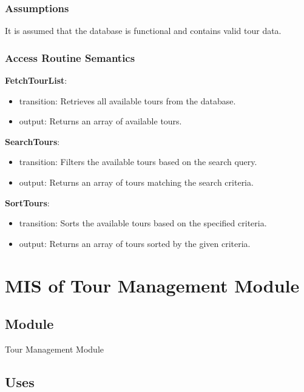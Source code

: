 \documentclass[12pt, titlepage]{article}
\begin{document}
\subsubsection{Assumptions}

It is assumed that the database is functional and contains valid tour data.

\subsubsection{Access Routine Semantics}

\noindent \textbf{FetchTourList}:
\begin{itemize}
  \item transition: Retrieves all available tours from the database.
  \item output: Returns an array of available tours.
\end{itemize}

\noindent \textbf{SearchTours}:
\begin{itemize}
  \item transition: Filters the available tours based on the search query.
  \item output: Returns an array of tours matching the search criteria.
\end{itemize}

\noindent \textbf{SortTours}:
\begin{itemize}
  \item transition: Sorts the available tours based on the specified criteria.
  \item output: Returns an array of tours sorted by the given criteria.
\end{itemize}

\newpage

\section{MIS of Tour Management Module} \label{TourManagementModule}

\subsection{Module}

Tour Management Module

\subsection{Uses}
\end{document}
